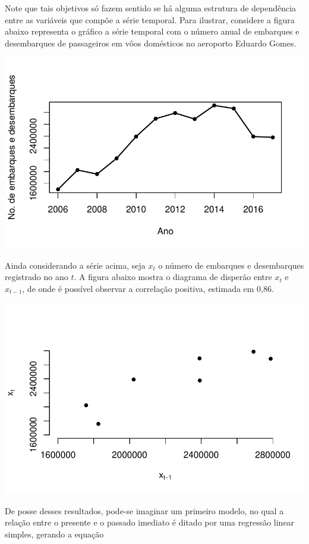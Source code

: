 \documentclass[
  letterpaper,
  DIV=11,
  numbers=noendperiod]{scrreprt}
\theoremstyle{definition}
\theoremstyle{plain}
\theoremstyle{definition}
\theoremstyle{remark}
\begin{document}
Note que tais objetivos só fazem sentido se há alguma estrutura de
dependência entre as variáveis que compõe a série temporal. Para
ilustrar, considere a figura abaixo representa o gráfico a série
temporal com o número anual de embarques e desembarques de passageiros
em vôos domésticos no aeroporto Eduardo Gomes.

\includegraphics{intro_files/figure-pdf/unnamed-chunk-1-1.pdf}

Ainda considerando a série acima, seja \(x_t\) o número de embarques e
desembarques registrado no ano \(t\). A figura abaixo mostra o diagrama
de disperão entre \(x_t\) e \(x_{t-1}\), de onde é possível observar a
correlação positiva, estimada em 0,86.

\includegraphics{intro_files/figure-pdf/unnamed-chunk-2-1.pdf}

De posse desses resultados, pode-se imaginar um primeiro modelo, no qual
a relação entre o presente e o passado imediato é ditado por uma
regressão linear simples, gerando a equação
\end{document}
